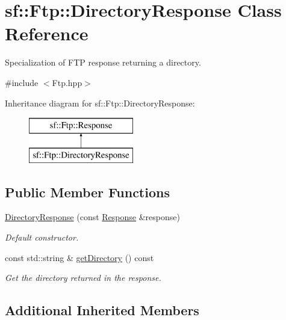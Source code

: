 \hypertarget{classsf_1_1Ftp_1_1DirectoryResponse}{\section{sf\-:\-:Ftp\-:\-:Directory\-Response Class Reference}
\label{classsf_1_1Ftp_1_1DirectoryResponse}
}


Specialization of F\-T\-P response returning a directory.  




{\ttfamily \#include $<$Ftp.\-hpp$>$}

Inheritance diagram for sf\-:\-:Ftp\-:\-:Directory\-Response\-:\begin{figure}[H]
\begin{center}
\leavevmode
\includegraphics[height=2.000000cm]{classsf_1_1Ftp_1_1DirectoryResponse}
\end{center}
\end{figure}
\subsection*{Public Member Functions}
\begin{DoxyCompactItemize}
\item 
\hyperlink{classsf_1_1Ftp_1_1DirectoryResponse_a36b6d2728fa53c4ad37b7a6307f4d388}{Directory\-Response} (const \hyperlink{classsf_1_1Ftp_1_1Response}{Response} \&response)
\begin{DoxyCompactList}\small\item\em Default constructor. \end{DoxyCompactList}\item 
const std\-::string \& \hyperlink{classsf_1_1Ftp_1_1DirectoryResponse_a500793778ad0ed223aa86ed8fbee28a3}{get\-Directory} () const 
\begin{DoxyCompactList}\small\item\em Get the directory returned in the response. \end{DoxyCompactList}\end{DoxyCompactItemize}
\subsection*{Additional Inherited Members}


